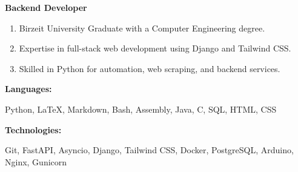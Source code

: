 \documentclass[9pt]{developercv} %
\begin{document}
\begin{minipage}[t]{0.46\textwidth}
	\vspace{-6pt}
    \textbf{Backend Developer}
    \begin{enumerate}[noitemsep]
        \item  Birzeit University Graduate with a Computer Engineering degree.
        \item  Expertise in full-stack web development using Django and Tailwind CSS\@.
        \item  Skilled in Python for automation, web scraping, and backend services.
    \end{enumerate}
   
    
   
\end{minipage}
\hfill %
\begin{minipage}[t]{0.465\textwidth}
    \vspace{-6pt}
    
    \begin{minipage}[t]{0.2\textwidth}
        \textbf{Languages:}
    \end{minipage}
    \hfill
    \begin{minipage}[t]{0.73\textwidth}
        Python, LaTeX, Markdown, Bash, Assembly, Java, C, SQL, HTML, CSS
    \end{minipage}
    \vspace{4mm}
    
    \begin{minipage}[t]{0.2\textwidth}
        \textbf{Technologies:}
    \end{minipage}
    \hfill
    \begin{minipage}[t]{0.73\textwidth}
        Git, FastAPI, Asyncio, Django, Tailwind CSS, Docker, PostgreSQL, Arduino, Nginx, Gunicorn
    \end{minipage}
    
    
\end{minipage}
\end{document}
